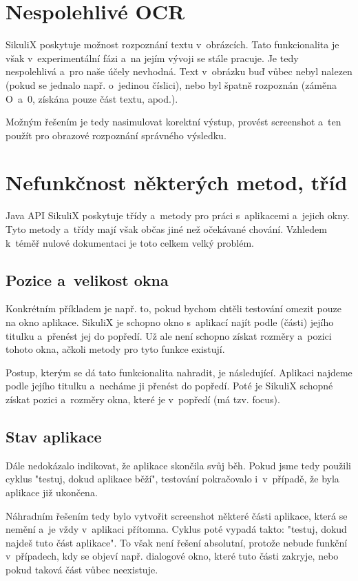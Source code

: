 	\section{Nespolehlivé OCR}
	SikuliX poskytuje možnost rozpoznání textu v~obrázcích. Tato funkcionalita je však v~experimentální fázi a~na jejím vývoji se stále pracuje. Je tedy nespolehlivá a~pro naše účely nevhodná. Text v~obrázku buď vůbec nebyl nalezen (pokud se jednalo např. o~jedinou číslici), nebo byl špatně rozpoznán (záměna O~a~0, získána pouze část textu, apod.).
	
	Možným řešením je tedy nasimulovat korektní výstup, provést screenshot a~ten použít pro obrazové rozpoznání správného výsledku.
	
	\section{Nefunkčnost některých metod, tříd}
	Java API SikuliX poskytuje třídy a~metody pro práci s~aplikacemi a~jejich okny. Tyto metody a~třídy mají však občas jiné než očekávané chování. Vzhledem k~téměř nulové dokumentaci je toto celkem velký problém.

		\subsection{Pozice a~velikost okna}		
		Konkrétním příkladem je např. to, pokud bychom chtěli testování omezit pouze na okno aplikace. SikuliX je schopno okno s~aplikací najít podle (části) jejího titulku a~přenést jej do popředí. Už ale není schopno získat rozměry a~pozici tohoto okna, ačkoli metody pro tyto funkce existují.
	
		Postup, kterým se dá tato funkcionalita nahradit, je následující. Aplikaci najdeme podle jejího titulku a~necháme ji přenést do popředí. Poté je SikuliX schopné získat pozici a~rozměry okna, které je v~popředí (má tzv. focus).
		
		\subsection{Stav aplikace}
		Dále nedokázalo indikovat, že aplikace skončila svůj běh. Pokud jsme tedy použili cyklus "testuj, dokud aplikace běží", testování pokračovalo i~v~případě, že byla aplikace již ukončena.
	
		Náhradním řešením tedy bylo vytvořit screenshot některé části aplikace, která se nemění a~je vždy v~aplikaci přítomna. Cyklus poté vypadá takto: "testuj, dokud najdeš tuto část aplikace". To však není řešení absolutní, protože nebude funkční v~případech, kdy se objeví např. dialogové okno, které tuto části zakryje, nebo pokud taková část vůbec neexistuje.
		
